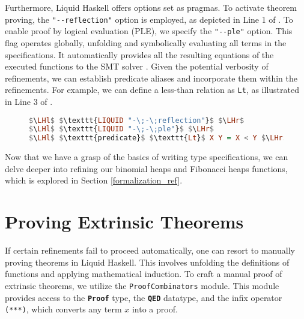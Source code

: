 \documentclass{clmthesis}
\begin{document}
Furthermore, Liquid Haskell offers options set as pragmas. To activate theorem proving, the \texttt{"-\;-\;reflection"} option is employed, as depicted in Line 1 of .
To enable proof by logical evaluation (PLE), we specify the \texttt{"-\;-\;ple"} option. This flag operates globally, unfolding and symbolically evaluating all terms in the specifications. It automatically provides all the resulting equations of the executed functions to the SMT solver \cite{vazou2018theorem}.
Given the potential verbosity of refinements, we can establish predicate aliases and incorporate them within the refinements. For example, we can define a less-than relation as \texttt{Lt}, as illustrated in Line 3 of .

\begin{figure}[h]
\begin{lstlisting}[mathescape=true, language=haskell, caption={Pragmas and predicates.},captionpos=b, label=fig:pragma]
$\LHl$ $\texttt{LIQUID "-\;-\;reflection"}$ $\LHr$
$\LHl$ $\texttt{LIQUID "-\;-\;ple"}$ $\LHr$
$\LHl$ $\texttt{predicate}$ $\texttt{Lt}$ X Y = X < Y $\LHr$
\end{lstlisting}
\end{figure}

Now that we have a grasp of the basics of writing type specifications, we can delve deeper into refining our binomial heaps and Fibonacci heaps functions, which is explored in Section \ref{formalization_ref}.


\section{Proving Extrinsic Theorems}\label{lh_proof}
If certain refinements fail to proceed automatically, one can resort to manually proving theorems in Liquid Haskell. This involves unfolding the definitions of functions and applying mathematical induction. To craft a manual proof of extrinsic theorems, we utilize the \texttt{ProofCombinators} module. This module provides access to the \textbf{\lstinline{Proof}} type, the \textbf{\lstinline{QED}} datatype, and the infix operator \texttt{(***)}, which converts any term $x$ into a proof.
\end{document}
